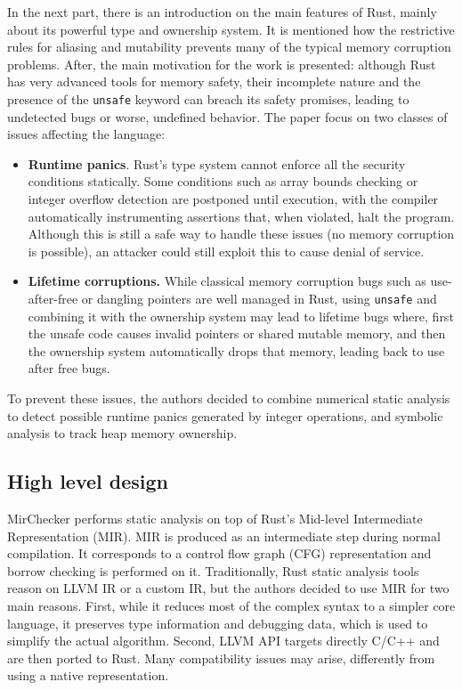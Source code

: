\documentclass{article}
\begin{document}
In the next part, there is an introduction on the  main features of Rust, mainly about its 
powerful type and ownership system. It is mentioned how the restrictive rules for aliasing and mutability prevents many of the typical memory corruption problems. After, the main motivation for the work is presented: although 
Rust has very advanced tools for memory safety, their incomplete nature and the presence of the \texttt{unsafe} keyword  can breach its safety promises, leading  to undetected bugs or worse, undefined behavior. The paper focus on two 
classes of issues affecting the language: \begin{itemize}
    \item \textbf{Runtime panics}.  Rust's type system cannot enforce all the security conditions statically. Some conditions such as array bounds checking or integer overflow detection are postponed until execution, with 
    the compiler automatically instrumenting assertions that, when violated, halt the program. Although this is still a safe way to handle these issues (no memory corruption is possible), an attacker could still exploit this 
    to cause denial of service.
    \item \textbf{Lifetime corruptions.} While  classical memory corruption bugs such as use-after-free or dangling pointers are well managed in Rust, using \texttt{unsafe} and combining 
    it with the ownership system may lead to lifetime bugs where, first the unsafe code  causes invalid pointers or shared mutable memory, and then the ownership system automatically drops that memory, leading back to use after free bugs.
\end{itemize}
To prevent these issues, the authors decided to combine numerical static analysis to detect possible runtime panics generated by integer operations,
 and symbolic analysis to track heap memory ownership.
\subsection*{High level design}
MirChecker performs static analysis on top of Rust's Mid-level Intermediate Representation (MIR). MIR is produced as an intermediate step during normal compilation. 
It corresponds to a control flow graph (CFG) representation  and borrow checking is performed on it. Traditionally, Rust static analysis tools reason on LLVM IR or  a custom IR, but the authors decided to use MIR 
for two main reasons. First, while it reduces most of the complex syntax to a simpler core language, it preserves type information and debugging data, which is used to simplify the actual algorithm.
Second, LLVM API targets directly C/C++ and are then ported to Rust. Many compatibility issues may arise, differently from using 
a native representation. 
\end{document}
